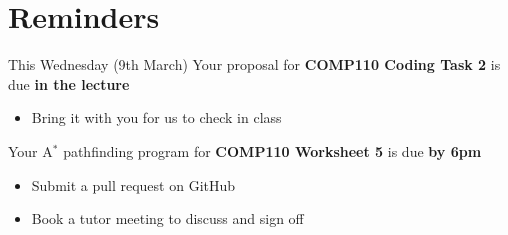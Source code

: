 \part{Reminders}
\frame{\partpage}

\begin{frame}{This Wednesday (9th March)}
    Your proposal for \textbf{COMP110 Coding Task 2} is due \textbf{in the lecture}
    \begin{itemize}
        \item Bring it with you for us to check in class
    \end{itemize} \pause
    Your A$^*$ pathfinding program for \textbf{COMP110 Worksheet 5} is due \textbf{by 6pm}
    \begin{itemize}
        \item Submit a pull request on GitHub
        \item Book a tutor meeting to discuss and sign off
    \end{itemize}
\end{frame}
